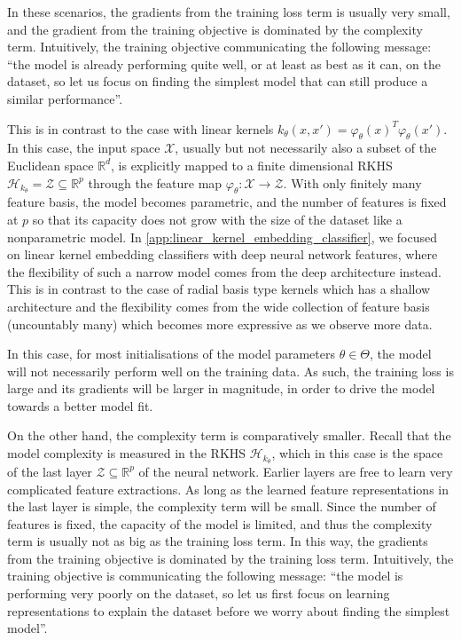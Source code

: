 \documentclass{article}
\begin{document}
		In these scenarios, the gradients from the training loss term is usually very small, and the gradient from the training objective is dominated by the complexity term. Intuitively, the training objective communicating the following message: ``the model is already performing quite well, or at least as best as it can, on the dataset, so let us focus on finding the simplest model that can still produce a similar performance''.
		
		This is in contrast to the case with linear kernels $k_{\theta}(x, x') = \varphi_{\theta}(x)^{T} \varphi_{\theta}(x')$. In this case, the input space $\mathcal{X}$, usually but not necessarily also a subset of the Euclidean space $\mathbb{R}^{d}$, is explicitly mapped to a finite dimensional RKHS $\mathcal{H}_{k_{\theta}} = \mathcal{Z} \subseteq \mathbb{R}^{p}$ through the feature map $\varphi_{\theta} : \mathcal{X} \to \mathcal{Z}$. With only finitely many feature basis, the model becomes parametric, and the number of features is fixed at $p$ so that its capacity does not grow with the size of the dataset like a nonparametric model. In \cref{app:linear_kernel_embedding_classifier}, we focused on linear kernel embedding classifiers with deep neural network features, where the flexibility of such a narrow model comes from the deep architecture instead. This is in contrast to the case of radial basis type kernels which has a shallow architecture and the flexibility comes from the wide collection of feature basis (uncountably many) which becomes more expressive as we observe more data.
		
		In this case, for most initialisations of the model parameters $\theta \in \Theta$, the model will not necessarily perform well on the training data. As such, the training loss is large and its gradients will be larger in magnitude, in order to drive the model towards a better model fit.
		
		On the other hand, the complexity term is comparatively smaller. Recall that the model complexity is measured in the RKHS $\mathcal{H}_{k_{\theta}}$, which in this case is the space of the last layer $\mathcal{Z} \subseteq \mathbb{R}^{p}$ of the neural network. Earlier layers are free to learn very complicated feature extractions. As long as the learned feature representations in the last layer is simple, the complexity term will be small. Since the number of features is fixed, the capacity of the model is limited, and thus the complexity term is usually not as big as the training loss term. In this way, the gradients from the training objective is dominated by the training loss term. Intuitively, the training objective is communicating the following message: ``the model is performing very poorly on the dataset, so let us first focus on learning representations to explain the dataset before we worry about finding the simplest model''.
	
\end{document}
